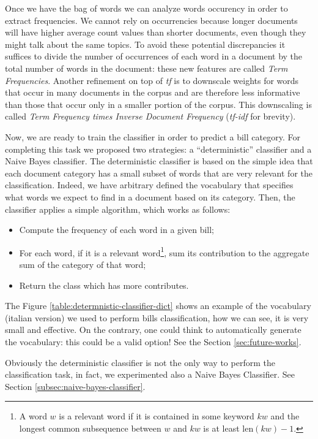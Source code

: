 \documentclass[10pt,twocolumn,letterpaper]{article}
\begin{document}
Once we have the bag of words we can analyze words occurency in order
to extract frequencies. We cannot rely on occurrencies because longer
documents will have higher average count values than shorter
documents, even though they might talk about the same topics. To avoid
these potential discrepancies it suffices to divide the number of
occurrences of each word in a document by the total number of words in
the document: these new features are called \emph{Term
  Frequencies}. Another refinement on top of \emph{tf} is to downscale
weights for words that occur in many documents in the corpus and are
therefore less informative than those that occur only in a smaller
portion of the corpus. This downscaling is called \emph{Term Frequency
  times Inverse Document Frequency} (\emph{tf-idf} for brevity).

Now, we are ready to train the classifier in order to predict a bill
category. For completing this task we proposed two strategies: a
``deterministic'' classifier and a Naive Bayes classifier. The
deterministic classifier is based on the simple idea that each
document category has a small subset of words that are very relevant
for the classification. Indeed, we have arbitrary defined the
vocabulary that specifies what words we expect to find in a document
based on its category. Then, the classifier applies a simple
algorithm, which works as follows:

\begin{itemize}
  \item Compute the frequency of each word in a given bill;
  \item For each word, if it is a relevant word\footnote{A word $w$ is
    a relevant word if it is contained in some keyword $kw$ and the
    longest common subsequence between $w$ and $kw$ is at least
    $\mathrm{len}(kw) - 1$.}, sum its contribution to the aggregate
    sum of the category of that word;
  \item Return the class which has more contributes.
\end{itemize}

The Figure \ref{table:determnistic-classifier-dict} shows an example
of the vocabulary (italian version) we used to perform bills
classification, how we can see, it is very small and effective.  On
the contrary, one could think to automatically generate the
vocabulary: this could be a valid option! See the Section
\ref{sec:future-works}.

Obviously the deterministic classifier is not the only way to perform
the classification task, in fact, we experimented also a Naive Bayes
Classifier. See Section \ref{subsec:naive-bayes-classifier}.
\end{document}
